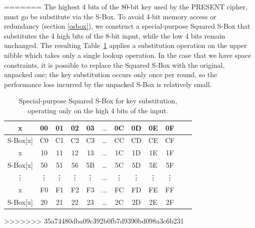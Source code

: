 \documentclass[11pt]{article}
\begin{document}


=======
The highest 4 bits of the 80-bit key used by the PRESENT cipher, must go be substitute via the S-Box. To avoid 4-bit memory access or redundancy (section \ref{osbox}), we construct a special-purpose Squared S-Box that substitutes the 4 high bits of the 8-bit input, while the low 4 bits remain unchanged. The resulting Table~\ref{key_sbox} applies a substitution operation on the upper nibble which takes only a single lookup operation. In the case that we have space constraints, it is possible to replace the Squared S-Box with the original, unpacked one; the key substitution occurs only once per round, so the performance loss incurred by the unpacked S-Box is relatively small. 

\begin{table}[h]
\footnotesize
\centering
\begin{tabular}{| c | c  | c | c | c  | c  | c | c | c  | c | c | c |}
\hline
  x & 00 & 01 & 02 & 03  &  $\dots$  & 0C & 0D & 0E & 0F   \\
\hline
 S-Box[x] & C0 & C1 & C2 & C3 & \dots & CC & CD & CE & CF   \\
\hline
  x & 10 & 11 & 12 & 13  &  $\dots$  & 1C & 1D & 1E & 1F   \\
\hline
 S-Box[x] & 50 & 51 & 56 & 5B & \dots & 5C & 5D & 5E & 5F   \\
\hline
  \vdots & \vdots & \vdots & \vdots & \vdots  &  $\dots$  & \vdots &\vdots & \vdots & \vdots   \\

\hline
  x & F0 & F1 & F2 & F3  &  $\dots$  & FC & FD & FE & FF   \\
\hline
 S-Box[x] & 20 & 21 & 22 & 23 & \dots & 2C & 2D & 2E & 2F   \\
\hline


\end{tabular}
 \caption{\footnotesize Special-purpose Squared S-Box for key substitution, operating only on the high 4 bits of the input.}
 \label{key_sbox}
\end{table}
>>>>>>> 35a74480dba09c392b0fb7d9390bd098a3c6b231
\end{document}
